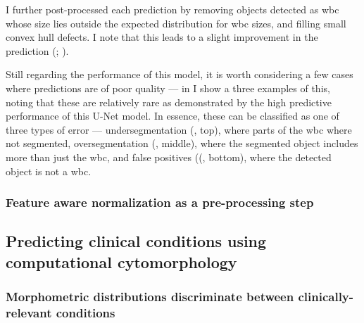I further post-processed each prediction by removing objects detected as \ac{wbc} whose size lies outside the expected distribution for \ac{wbc} sizes, and filling small convex hull defects. I note that this leads to a slight improvement in the prediction (; ). 

\begin{figure}[!ht]
    \label{fig:u-net-post-process-metrics}
\end{figure}

Still regarding the performance of this model, it is worth considering a few cases where predictions are of poor quality --- in  I show a three examples of this, noting that these are relatively rare as demonstrated by the high predictive performance of this U-Net model. In essence, these can be classified as one of three types of error --- undersegmentation (, top), where parts of the \ac{wbc} where not segmented, oversegmentation (, middle), where the segmented object includes more than just the \ac{wbc}, and false positives ((, bottom), where the detected object is not a \ac{wbc}. 

\begin{figure}[!ht]
    \label{fig:wbc-segmentation-bad}
\end{figure}


\subsubsection{Feature aware normalization as a pre-processing step}

\subsection{Predicting clinical conditions using computational cytomorphology}

\subsubsection{Morphometric distributions discriminate between clinically-relevant conditions}


